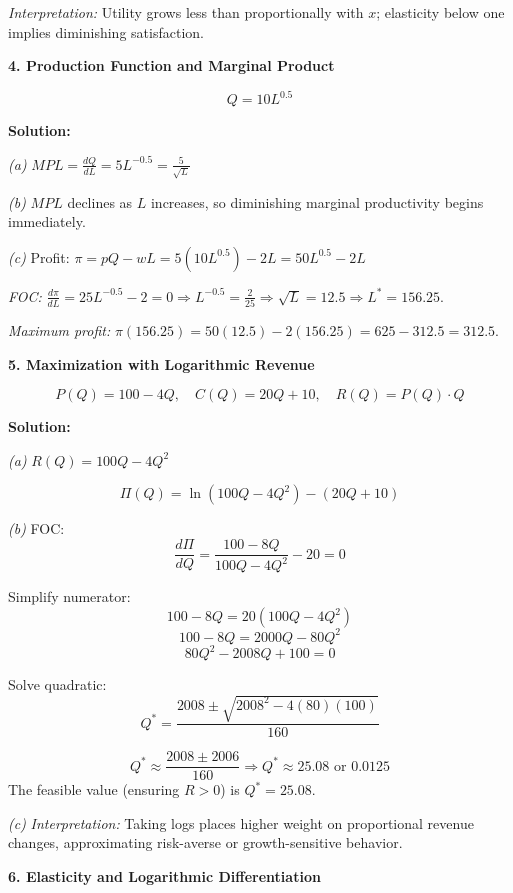 \documentclass[12pt]{article}
\begin{document}
\textit{Interpretation:} Utility grows less than proportionally with \(x\); elasticity below one implies diminishing satisfaction.

\vspace{1em}

\textbf{4. Production Function and Marginal Product}

\[
Q = 10L^{0.5}
\]

\textbf{Solution:}

\textit{(a)} \( MPL = \frac{dQ}{dL} = 5L^{-0.5} = \frac{5}{\sqrt{L}} \)

\textit{(b)} \( MPL \) declines as \( L \) increases, so diminishing marginal productivity begins immediately.

\textit{(c)} Profit: \( \pi = pQ - wL = 5(10L^{0.5}) - 2L = 50L^{0.5} - 2L \)

\textit{FOC:} \( \frac{d\pi}{dL} = 25L^{-0.5} - 2 = 0 \Rightarrow L^{-0.5} = \frac{2}{25} \Rightarrow \sqrt{L} = 12.5 \Rightarrow L^* = 156.25. \)

\textit{Maximum profit:} \( \pi(156.25) = 50(12.5) - 2(156.25) = 625 - 312.5 = 312.5. \)

\vspace{1em}

\textbf{5. Maximization with Logarithmic Revenue}

\[
P(Q) = 100 - 4Q, \quad C(Q) = 20Q + 10, \quad R(Q) = P(Q)\cdot Q
\]

\textbf{Solution:}

\textit{(a)} \( R(Q) = 100Q - 4Q^2 \)

\[
\Pi(Q) = \ln(100Q - 4Q^2) - (20Q + 10)
\]

\textit{(b)} FOC:
\[
\frac{d\Pi}{dQ} = \frac{100 - 8Q}{100Q - 4Q^2} - 20 = 0
\]

Simplify numerator:
\[
100 - 8Q = 20(100Q - 4Q^2)
\]
\[
100 - 8Q = 2000Q - 80Q^2
\]
\[
80Q^2 - 2008Q + 100 = 0
\]

Solve quadratic:
\[
Q^* = \frac{2008 \pm \sqrt{2008^2 - 4(80)(100)}}{160}
\]

\[
Q^* \approx \frac{2008 \pm 2006}{160}
\Rightarrow Q^* \approx 25.08 \text{ or } 0.0125
\]
The feasible value (ensuring \(R>0\)) is \( Q^* = 25.08. \)

\textit{(c)} \textit{Interpretation:} Taking logs places higher weight on proportional revenue changes, approximating risk-averse or growth-sensitive behavior.

\vspace{1em}

\textbf{6. Elasticity and Logarithmic Differentiation}
\end{document}
